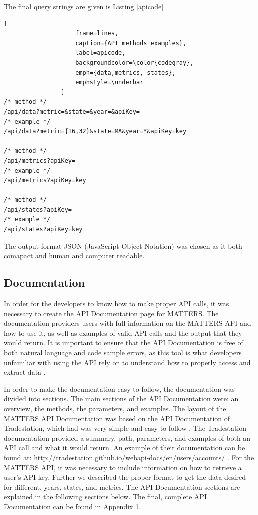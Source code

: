 				The final query strings are given is Listing \ref{apicode}
				
				\begin{lstlisting}[
					frame=lines,
					caption={API methods examples}, 
					label=apicode, 
					backgroundcolor=\color{codegray}, 
					emph={data,metrics, states},
					emphstyle=\underbar
				]
/* method */
/api/data?metric=&state=&year=&apiKey=
/* example */
/api/data?metric={16,32}&state=MA&year=*&apiKey=key

/* method */
/api/metrics?apiKey=
/* example */
/api/metrics?apiKey=key

/* method */
/api/states?apiKey=
/* example */
/api/states?apiKey=key
				\end{lstlisting}
				
				The output format JSON (JavaScript Object Notation) was chosen
				as it both comapact and human and computer readable. 
				
			\subsection{Documentation}
				
				In order for the developers to know how to make proper API calls, 
				it was necessary to create the API Documentation page for MATTERS. 
				The documentation providers users with full information on the MATTERS API 
				and how to use it, as well as examples of valid API calls and the output 
				that they would return. It is important to ensure that the API Documentation 
				is free of both natural language and code sample errors, as this tool is 
				what developers unfamiliar with using the API rely on to understand how 
				to properly access and extract data \cite{errors}. 
				
				In order to make the documentation easy to follow, the documentation was divided into sections. 
				The main sections of the API Documentation were: an overview, the methods, 
				the parameters, and examples. The layout of the MATTERS API Documentation was based on the 
				API Documentation of Tradestation, which had was very simple and easy to follow \cite{apiex}. 
				The Tradestation documentation provided a summary, path, parameters, and examples of both an 
				API call and what it would return. An example of their documentation can be found at: 
				http://tradestation.github.io/webapi-docs/en/users/accounts/ \cite{apiex}. For the MATTERS API, 
				it was necessary to include information on how to retrieve a user's API key. 
				Further we described the proper format to get the data desired for different, years, states, 
				and metrics. The API Documentation sections are explained in the following sections below. 
				The final, complete API Documentation can be found in Appendix 1.
				
